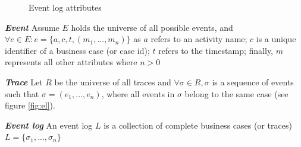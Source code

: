 \begin{figure}[htb]
	\begin{center}
		\caption{Event log attributes}
		\label{fig:attr}
	\end{center}
\end{figure}



\theoremstyle{definition}
\begin{definition}{\textit{\textbf{Event}}}
	Assume $E$ holds the universe of all possible events, and $ \forall e \in E: e = \{a, c, t, (m_1, ..., m_n)\}$ as $a$ refers to an activity name; $c$ is a unique identifier of a business case (or case id); $t$ refers to the timestamp; finally, $m$ represents all other attributes where $n > 0$
\end{definition}


\begin{definition}{\textit{\textbf{Trace}}}
	Let $R$ be the universe of all traces and $\forall \sigma \in R,  \sigma$ is a sequence of events such that $\sigma = (e_1, ..., e_n)$, where all events in $ \sigma $ belong to the same case (see figure \ref{fig:el}).
\end{definition}

\begin{definition}{\textit{\textbf{Event log}}}
	An event log $L$ is a collection of complete business cases (or traces) $L=\{\sigma_1, ..., \sigma_n \}$
	
\end{definition}

